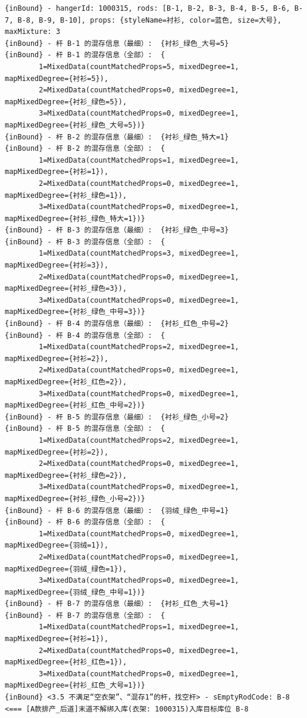 {\begin{verbatim}
{inBound} - hangerId: 1000315, rods: [B-1, B-2, B-3, B-4, B-5, B-6, B-7, B-8, B-9, B-10], props: {styleName=衬衫, color=蓝色, size=大号}, maxMixture: 3
{inBound} - 杆 B-1 的混存信息（最细）:  {衬衫_绿色_大号=5}
{inBound} - 杆 B-1 的混存信息（全部）:  {
		1=MixedData(countMatchedProps=5, mixedDegree=1, mapMixedDegree={衬衫=5}), 
		2=MixedData(countMatchedProps=0, mixedDegree=1, mapMixedDegree={衬衫_绿色=5}), 
		3=MixedData(countMatchedProps=0, mixedDegree=1, mapMixedDegree={衬衫_绿色_大号=5})}
{inBound} - 杆 B-2 的混存信息（最细）:  {衬衫_绿色_特大=1}
{inBound} - 杆 B-2 的混存信息（全部）:  {
		1=MixedData(countMatchedProps=1, mixedDegree=1, mapMixedDegree={衬衫=1}), 
		2=MixedData(countMatchedProps=0, mixedDegree=1, mapMixedDegree={衬衫_绿色=1}), 
		3=MixedData(countMatchedProps=0, mixedDegree=1, mapMixedDegree={衬衫_绿色_特大=1})}
{inBound} - 杆 B-3 的混存信息（最细）:  {衬衫_绿色_中号=3}
{inBound} - 杆 B-3 的混存信息（全部）:  {
		1=MixedData(countMatchedProps=3, mixedDegree=1, mapMixedDegree={衬衫=3}), 
		2=MixedData(countMatchedProps=0, mixedDegree=1, mapMixedDegree={衬衫_绿色=3}), 
		3=MixedData(countMatchedProps=0, mixedDegree=1, mapMixedDegree={衬衫_绿色_中号=3})}
{inBound} - 杆 B-4 的混存信息（最细）:  {衬衫_红色_中号=2}
{inBound} - 杆 B-4 的混存信息（全部）:  {
		1=MixedData(countMatchedProps=2, mixedDegree=1, mapMixedDegree={衬衫=2}), 
		2=MixedData(countMatchedProps=0, mixedDegree=1, mapMixedDegree={衬衫_红色=2}), 
		3=MixedData(countMatchedProps=0, mixedDegree=1, mapMixedDegree={衬衫_红色_中号=2})}
{inBound} - 杆 B-5 的混存信息（最细）:  {衬衫_绿色_小号=2}
{inBound} - 杆 B-5 的混存信息（全部）:  {
		1=MixedData(countMatchedProps=2, mixedDegree=1, mapMixedDegree={衬衫=2}), 
		2=MixedData(countMatchedProps=0, mixedDegree=1, mapMixedDegree={衬衫_绿色=2}), 
		3=MixedData(countMatchedProps=0, mixedDegree=1, mapMixedDegree={衬衫_绿色_小号=2})}
{inBound} - 杆 B-6 的混存信息（最细）:  {羽绒_绿色_中号=1}
{inBound} - 杆 B-6 的混存信息（全部）:  {
		1=MixedData(countMatchedProps=0, mixedDegree=1, mapMixedDegree={羽绒=1}), 
		2=MixedData(countMatchedProps=0, mixedDegree=1, mapMixedDegree={羽绒_绿色=1}), 
		3=MixedData(countMatchedProps=0, mixedDegree=1, mapMixedDegree={羽绒_绿色_中号=1})}
{inBound} - 杆 B-7 的混存信息（最细）:  {衬衫_红色_大号=1}
{inBound} - 杆 B-7 的混存信息（全部）:  {
		1=MixedData(countMatchedProps=1, mixedDegree=1, mapMixedDegree={衬衫=1}), 
		2=MixedData(countMatchedProps=0, mixedDegree=1, mapMixedDegree={衬衫_红色=1}), 
		3=MixedData(countMatchedProps=0, mixedDegree=1, mapMixedDegree={衬衫_红色_大号=1})}
{inBound} <3.5 不满足“空衣架”、“混存1”的杆，找空杆> - sEmptyRodCode: B-8
<=== [A款排产_后道]末道不解绑入库(衣架: 1000315)入库目标库位 B-8


\end{verbatim}}
